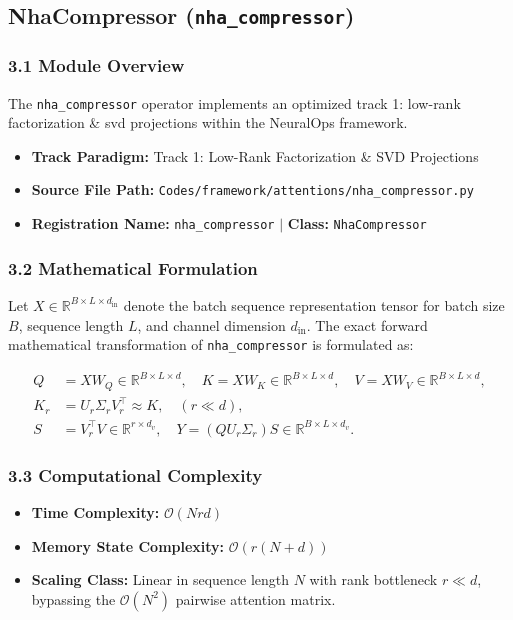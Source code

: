 \subsection{NhaCompressor (\texttt{nha\_compressor})}
\label{sec:app_module_nha_compressor}

\subsubsection*{3.1 Module Overview}
The \texttt{nha\_compressor} operator implements an optimized track 1: low-rank factorization \& svd projections within the NeuralOps framework.
\begin{itemize}
    \item \textbf{Track Paradigm:} Track 1: Low-Rank Factorization \& SVD Projections
    \item \textbf{Source File Path:} \texttt{Codes/framework/attentions/nha\_compressor.py}
    \item \textbf{Registration Name:} \texttt{nha\_compressor} $\mid$ \textbf{Class:} \texttt{NhaCompressor}
\end{itemize}

\subsubsection*{3.2 Mathematical Formulation}
Let $X \in \mathbb{R}^{B \times L \times d_{\text{in}}}$ denote the batch sequence representation tensor for batch size $B$, sequence length $L$, and channel dimension $d_{\text{in}}$. The exact forward mathematical transformation of \texttt{nha\_compressor} is formulated as:

\begin{align}
Q &= X W_Q \in \mathbb{R}^{B \times L \times d}, \quad K = X W_K \in \mathbb{R}^{B \times L \times d}, \quad V = X W_V \in \mathbb{R}^{B \times L \times d}, \\
K_r &= U_r \Sigma_r V_r^\top \approx K, \quad (r \ll d), \\
S &= V_r^\top V \in \mathbb{R}^{r \times d_v}, \quad Y = (Q U_r \Sigma_r) S \in \mathbb{R}^{B \times L \times d_v}.
\end{align}


\subsubsection*{3.3 Computational Complexity}
\begin{itemize}
    \item \textbf{Time Complexity:} $\mathcal{O}(N r d)$
    \item \textbf{Memory State Complexity:} $\mathcal{O}(r(N + d))$
    \item \textbf{Scaling Class:} Linear in sequence length $N$ with rank bottleneck $r \ll d$, bypassing the $\mathcal{O}(N^2)$ pairwise attention matrix.
\end{itemize}

